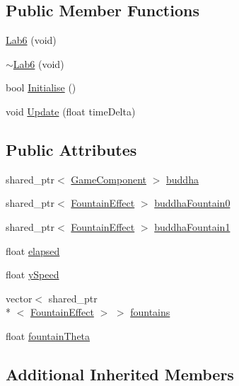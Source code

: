 \subsection*{Public Member Functions}
\begin{DoxyCompactItemize}
\item 
\hyperlink{class_b_g_e_1_1_lab6_ae8a7fc1fadc3ab3228621fbc0b58a10b}{Lab6} (void)
\item 
\hyperlink{class_b_g_e_1_1_lab6_a6a7b05f206023dbd2235c8251e81f3ff}{$\sim$\-Lab6} (void)
\item 
bool \hyperlink{class_b_g_e_1_1_lab6_a4c6c1fca3a0fce3be6be36896c84b1c8}{Initialise} ()
\item 
void \hyperlink{class_b_g_e_1_1_lab6_ace5577edb1f9c38e007f20b843fe1030}{Update} (float time\-Delta)
\end{DoxyCompactItemize}
\subsection*{Public Attributes}
\begin{DoxyCompactItemize}
\item 
shared\-\_\-ptr$<$ \hyperlink{class_b_g_e_1_1_game_component}{Game\-Component} $>$ \hyperlink{class_b_g_e_1_1_lab6_a53343e346cb79486f9a298257e838eb7}{buddha}
\item 
shared\-\_\-ptr$<$ \hyperlink{class_b_g_e_1_1_fountain_effect}{Fountain\-Effect} $>$ \hyperlink{class_b_g_e_1_1_lab6_a444f347fd43e8bc345d99f034d8db05a}{buddha\-Fountain0}
\item 
shared\-\_\-ptr$<$ \hyperlink{class_b_g_e_1_1_fountain_effect}{Fountain\-Effect} $>$ \hyperlink{class_b_g_e_1_1_lab6_a178f618b743064b6f742cd73315d1e40}{buddha\-Fountain1}
\item 
float \hyperlink{class_b_g_e_1_1_lab6_a6875058e98814ad42d46e1d05de66c51}{elapsed}
\item 
float \hyperlink{class_b_g_e_1_1_lab6_aaf30f90a1ae7641d70a128e1d1ba528f}{y\-Speed}
\item 
vector$<$ shared\-\_\-ptr\\*
$<$ \hyperlink{class_b_g_e_1_1_fountain_effect}{Fountain\-Effect} $>$ $>$ \hyperlink{class_b_g_e_1_1_lab6_a907686a8012ec6c836e77dc904977feb}{fountains}
\item 
float \hyperlink{class_b_g_e_1_1_lab6_a15b7ff91181622d802d12b924c7b47ba}{fountain\-Theta}
\end{DoxyCompactItemize}
\subsection*{Additional Inherited Members}


